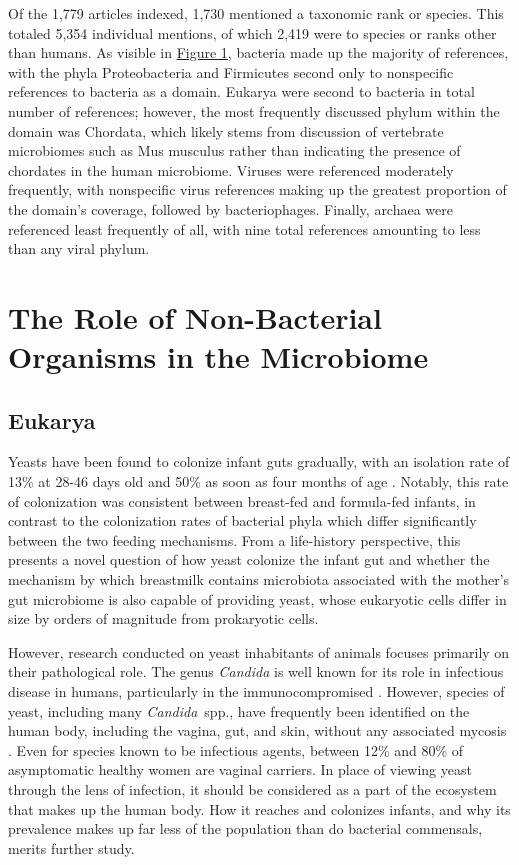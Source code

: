 \documentclass{../../../coursework}
\begin{document}
Of the 1,779 articles indexed, 1,730 mentioned a taxonomic rank or species.
This totaled 5,354 individual mentions, of which 2,419 were to species or
ranks other than humans. As visible in \hyperref[fig:1]{Figure 1}, bacteria
made up the majority of references, with the phyla Proteobacteria and
Firmicutes second only to nonspecific references to bacteria as a domain.
Eukarya were second to bacteria in total number of references; however, the
most frequently discussed phylum within the domain was Chordata, which likely
stems from discussion of vertebrate microbiomes such as Mus musculus rather
than indicating the presence of chordates in the human microbiome. Viruses
were referenced moderately frequently, with nonspecific virus references
making up the greatest proportion of the domain's coverage, followed by
bacteriophages. Finally, archaea were referenced least frequently of all,
with nine total references amounting to less than any viral phylum.

\section{The Role of Non-Bacterial Organisms in the Microbiome}

\subsection{Eukarya}

Yeasts have been found to colonize infant guts gradually, with an isolation
rate of 13\% at 28-46 days old \parencite{Ben84} and 50\% as
soon as four months of age \parencite{Ell75}.
Notably, this rate of colonization was consistent between breast-fed and
formula-fed infants, in contrast to the colonization rates of bacterial phyla
which differ significantly between the two feeding mechanisms. From a
life-history perspective, this presents a novel question of how yeast
colonize the infant gut and whether the mechanism by which breastmilk
contains microbiota associated with the mother's gut microbiome
\parencite{Mar13} is also capable of providing yeast, whose eukaryotic cells
differ in size by orders of magnitude from prokaryotic cells.

However, research conducted on yeast inhabitants of animals focuses primarily
on their pathological role. The genus \textit{Candida} is well known for its
role in infectious disease in humans, particularly in the immunocompromised
\parencite{Kou11}. However, species of yeast, including many
\textit{Candida}~spp., have frequently been identified on the human body,
including the vagina, gut, and skin, without any associated mycosis
\parencite{Man10}. Even for species known to be infectious agents, between
12\% \parencite{Cho86} and 80\% \parencite{Soe07} of asymptomatic healthy
women are vaginal carriers. In place of viewing yeast through the lens of
infection, it should be considered as a part of the ecosystem that makes up
the human body. How it reaches and colonizes infants, and why its prevalence
makes up far less of the population than do bacterial commensals, merits
further study.
\end{document}
